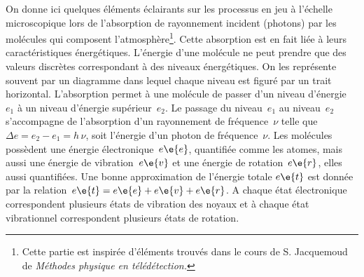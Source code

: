 \sk
On donne ici quelques éléments éclairants sur les processus en jeu à l'échelle microscopique lors de l'absorption de rayonnement incident (photons) par les molécules qui composent l'atmosphère\footnote{Cette partie est inspirée d'éléments trouvés dans le cours de S. Jacquemoud de \emph{Méthodes physique en télédétection.}}. Cette absorption est en fait liée à leurs caractéristiques énergétiques. L'énergie d'une molécule ne peut prendre que des valeurs discrètes correspondant à des niveaux énergétiques. On les représente
souvent par un diagramme dans lequel chaque niveau est figuré par un trait horizontal. L'absorption permet à une molécule de passer d'un niveau d'énergie~$e_1$ à un niveau d'énergie supérieur~$e_2$. Le passage du niveau~$e_1$ au niveau~$e_2$ s'accompagne de l'absorption d'un rayonnement de fréquence~$\nu$ telle que~$\Delta e = e_2 - e_1 = h \, \nu$, soit l'énergie d'un photon de fréquence~$\nu$. Les molécules possèdent une énergie électronique~$e\e{e}$, quantifiée comme les atomes, mais aussi une énergie de vibration~$e\e{v}$ et une énergie de rotation~$e\e{r}$, elles aussi quantifiées. Une bonne approximation de l'énergie totale $e\e{t}$ est donnée par la relation~$e\e{t} = e\e{e} + e\e{v} + e\e{r}$. A chaque état électronique correspondent plusieurs états de vibration des noyaux et à chaque état vibrationnel correspondent plusieurs états de rotation.



